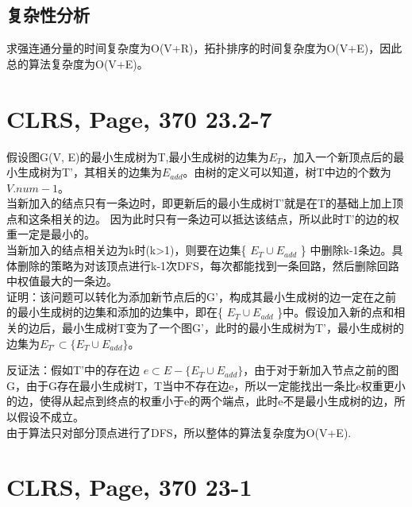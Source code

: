 \documentclass[UTF8]{ctexart}
\begin{document}
 \subsection{复杂性分析}
 求强连通分量的时间复杂度为O(V+R)，拓扑排序的时间复杂度为O(V+E)，因此总的算法复杂度为O(V+E)。


\section{CLRS, Page, 370 23.2-7}

假设图G(V, E)的最小生成树为T,最小生成树的边集为$E_T$，加入一个新顶点后的最小生成树为T'，其相关的边集为$E_{add}$。由树的定义可以知道，树T中边的个数为$V.num-1$。\\
当新加入的结点只有一条边时，即更新后的最小生成树T'就是在T的基础上加上顶点和这条相关的边。
因为此时只有一条边可以抵达该结点，所以此时T'的边的权重一定是最小的。\\
当新加入的结点相关边为k时(k>1)，则要在边集\{ $E_{T} \cup E_{add}$ \} 中删除k-1条边。具体删除的策略为对该顶点进行k-1次DFS，每次都能找到一条回路，然后删除回路中权值最大的一条边。\\

证明：该问题可以转化为添加新节点后的G'，构成其最小生成树的边一定在之前的最小生成树的边集和添加的边集中，即在\{ $E_{T} \cup E_{add}$ \}中。假设加入新的点和相关的边后，最小生成树T变为了一个图G'，此时的最小生成树为T'，最小生成树的边集为$E_{T'} \subset \{E_{T} \cup E_{add}\}  $。

反证法：假如T'中的存在边 $e \subset E - \{E_{T} \cup E_{add}\}$，由于对于新加入节点之前的图G，由于G存在最小生成树T，T当中不存在边e，所以一定能找出一条比e权重更小的边，使得从起点到终点的权重小于e的两个端点，此时e不是最小生成树的边，所以假设不成立。\\

由于算法只对部分顶点进行了DFS，所以整体的算法复杂度为O(V+E).


\section{CLRS, Page, 370 23-1}
\end{document}
